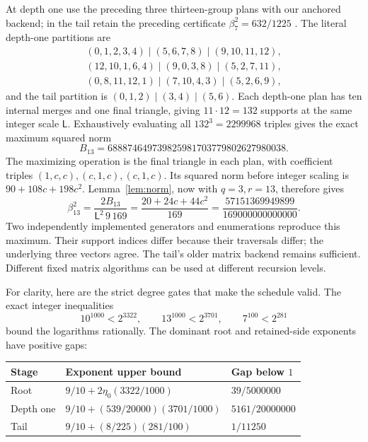 At depth one use the preceding three thirteen-group plans with our
anchored backend; in the tail retain the preceding certificate
\(\beta_7^2=632/1225\) \cite{trees,pairwise}.
The literal depth-one partitions are
\[
\begin{array}{l}
(0,1,2,3,4)\mid(5,6,7,8)\mid(9,10,11,12),\\
(12,10,1,6,4)\mid(9,0,3,8)\mid(5,2,7,11),\\
(0,8,11,12,1)\mid(7,10,4,3)\mid(5,2,6,9),
\end{array}
\]
and the tail partition is
\((0,1,2)\mid(3,4)\mid(5,6)\).
Each depth-one plan has ten internal merges and one final triangle,
giving \(11\cdot12=132\) supports at the same integer scale
\(\mathsf L\). Exhaustively evaluating all \(132^3=2299968\) triples
gives the exact maximum squared norm
\[
 B_{13}=688874649739825981703779802627980038.
\]
The maximizing operation is the final triangle in each plan, with
coefficient triples \((1,c,c),(c,1,c),(c,1,c)\).
Its squared norm before integer scaling is
\(90+108c+198c^2\). Lemma~\ref{lem:norm}, now with \(q=3,r=13\),
therefore gives
\begin{equation}\label{eq:beta13}
 \beta_{13}^2=\frac{2B_{13}}{\mathsf L^2\,9\,169}
  =\frac{20+24c+44c^2}{169}
  =\frac{57151369949899}{169000000000000}.
\end{equation}
Two independently implemented generators and enumerations reproduce
this maximum. Their support indices differ because their traversals
differ; the underlying three vectors agree. The tail's older matrix
backend remains sufficient. Different fixed matrix algorithms can be
used at different recursion levels.

For clarity, here are the strict degree gates that make the schedule
valid. The exact integer inequalities
\[
 10^{1000}<2^{3322},\qquad
 13^{1000}<2^{3701},\qquad
 7^{100}<2^{281}
\]
bound the logarithms rationally. The dominant root and retained-side
exponents have positive gaps:

\begin{center}
\begin{tabular}{@{}lll@{}}
\toprule
Stage & Exponent upper bound & Gap below \(1\)\\
\midrule
Root & \(9/10+2\eta_0(3322/1000)\) & \(39/5000000\)\\
Depth one & \(9/10+(539/20000)(3701/1000)\) & \(5161/20000000\)\\
Tail & \(9/10+(8/225)(281/100)\) & \(1/11250\)\\
\bottomrule
\end{tabular}
\end{center}

